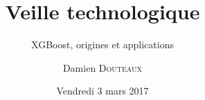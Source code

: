 \title{Veille technologique}
\subtitle{XGBoost, origines et applications}
\author{Damien \textsc{Douteaux}}
\date{Vendredi 3 mars 2017}
